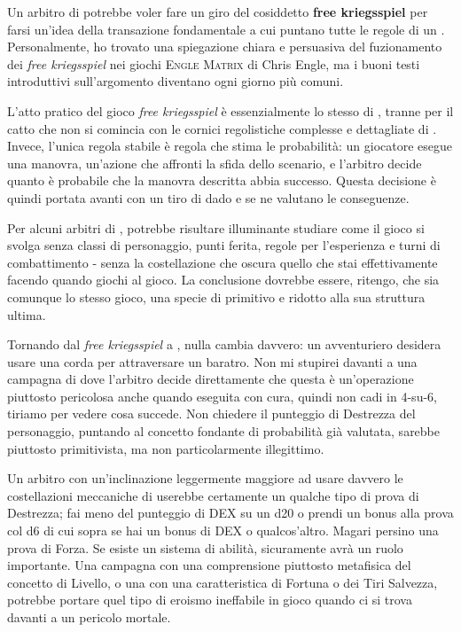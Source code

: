 
Un arbitro di \dnd{} potrebbe voler fare un giro del cosiddetto \textbf{free kriegsspiel} per farsi un'idea della transazione fondamentale a cui puntano tutte le regole di un . Personalmente, ho trovato una spiegazione chiara e persuasiva del fuzionamento dei \textit{free kriegsspiel} nei giochi \textsc{Engle Matrix} di Chris Engle, ma i buoni testi introduttivi sull'argomento diventano ogni giorno più comuni.

L'atto pratico del gioco \textit{free kriegsspiel} è essenzialmente lo stesso di \dnd{}, tranne per il catto che non si comincia con le cornici regolistiche complesse e dettagliate di \dnd{}. Invece, l'unica regola stabile è regola che stima le probabilità: un giocatore esegue una manovra, un'azione che affronti la sfida dello scenario, e l'arbitro decide quanto è probabile che la manovra descritta abbia successo. Questa decisione è quindi portata avanti con un tiro di dado e se ne valutano le conseguenze.

Per alcuni arbitri di \dnd{}, potrebbe risultare illuminante studiare come il gioco si svolga senza classi di personaggio, punti ferita, regole per l'esperienza e turni di combattimento - senza la costellazione che oscura quello che stai effettivamente facendo quando giochi al gioco. La conclusione dovrebbe essere, ritengo, che sia comunque lo stesso gioco, una specie di \dnd{} primitivo e ridotto alla sua struttura ultima.

Tornando dal \textit{free kriegsspiel} a \dnd{}, nulla cambia davvero: un avventuriero desidera usare una corda per attraversare un baratro. Non mi stupirei davanti a una campagna di \dnd{} dove l'arbitro decide direttamente che questa è un'operazione piuttosto pericolosa anche quando eseguita con cura, quindi non cadi in 4-su-6, tiriamo per vedere cosa succede. Non chiedere il punteggio di Destrezza del personaggio, puntando al concetto fondante di probabilità già valutata, sarebbe piuttosto primitivista, ma non particolarmente illegittimo.

Un arbitro con un'inclinazione leggermente maggiore ad usare davvero le costellazioni meccaniche di \dnd{} userebbe certamente un qualche tipo di prova di Destrezza; fai meno del punteggio di DEX su un d20 o prendi un bonus alla prova col d6 di cui sopra se hai un bonus di DEX o qualcos'altro. Magari persino una prova di Forza. Se esiste un sistema di abilità, sicuramente avrà un ruolo importante. Una campagna con una comprensione piuttosto metafisica del concetto di Livello, o una con una caratteristica di Fortuna o dei Tiri Salvezza, potrebbe portare quel tipo di eroismo ineffabile in gioco quando ci si trova davanti a un pericolo mortale.

